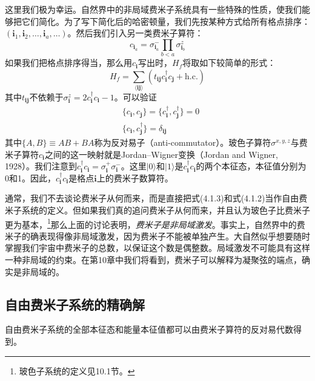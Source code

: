 这里我们极为幸运。自然界中的非局域费米子系统具有一些特殊的性质，使我们能够把它们简化。为了写下简化后的哈密顿量，我们先按某种方式给所有格点排序：$(\pmb{i}_1,\pmb{i}_2,\ldots,\pmb{i}_a,\ldots)$。然后我们引入另一类费米子算符：
\begin{equation*}
c_{\pmb{i}_a}=\sigma_{\pmb{i}_a}^{-}\prod_{b<a}\sigma_{\pmb{i}_b}^{z}\tag{4.1.1}
\end{equation*}
如果我们把格点排序得当，那么用$c_{\pmb{i}}$写出时，$H_f$将取如下较简单的形式：
\begin{equation*}
H_f=\sum_{\langle\pmb{i}\pmb{j}\rangle}(t_{\pmb{i}\pmb{j}}c_{\pmb{i}}^{\dagger}c_{\pmb{j}}+\text{h.c.})\tag{4.1.2}
\end{equation*}
其中$t_{\pmb{i}\pmb{j}}$不依赖于$\sigma_{\pmb{i}}^{z}=2c_{\pmb{i}}^{\dagger}c_{\pmb{i}}-1$。可以验证
\begin{align*}
&\{c_{\pmb{i}},c_{\pmb{j}}\}=\{c_{\pmb{i}}^{\dagger},c_{\pmb{j}}^{\dagger}\}=0\\
&\{c_{\pmb{i}},c_{\pmb{j}}^{\dagger}\}=\delta_{\pmb{i}\pmb{j}}\tag{4.1.3}
\end{align*}
其中$\{A,B\}\equiv AB+BA$称为反对易子（anti-commutator）。玻色子算符$\sigma^{x,y,z}$与费米子算符$c_{\pmb{i}}$之间的这一映射就是Jordan--Wigner变换（Jordan and Wigner, 1928）。我们注意到$c_{\pmb{i}}^{\dagger}c_{\pmb{i}}=\sigma_{\pmb{i}}^{+}\sigma_{\pmb{i}}^{-}$。这里$|0\rangle$和$|1\rangle$是$c_{\pmb{i}}^{\dagger}c_{\pmb{i}}$的两个本征态，本征值分别为0和1。因此，$c_{\pmb{i}}^{\dagger}c_{\pmb{i}}$是格点$\pmb{i}$上的费米子数算符。

通常，我们不去谈论费米子从何而来，而是直接把式(4.1.3)和式(4.1.2)当作自由费米子系统的定义。但如果我们真的追问费米子从何而来，并且认为玻色子比费米子更为基本，\footnote{玻色子系统的定义见10.1节。}那么上面的讨论表明，\emph{费米子是非局域激发}。事实上，自然界中的费米子的确表现得像非局域激发，因为费米子不能被单独产生。大自然似乎想要随时掌握我们宇宙中费米子的总数，以保证这个数是偶整数。局域激发不可能具有这样一种非局域的约束。在第10章中我们将看到，费米子可以解释为凝聚弦的端点，确实是非局域的。

\subsection{自由费米子系统的精确解}

\begin{keypoints}
\item 自由费米子系统的全部本征态和能量本征值都可以由费米子算符的反对易代数得到。
\end{keypoints}


